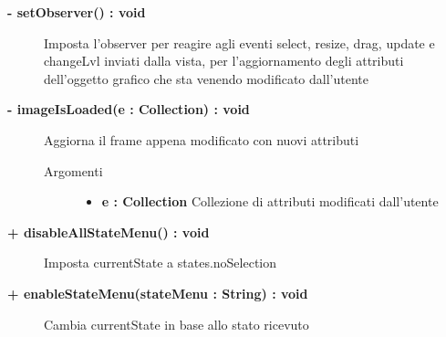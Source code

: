 \begin{description}
\begin{description}
\begin{description}
\begin{itemize}
				\end{itemize}
				
		\end{description}
	\end{description}
	
	\begin{description}
		\item[\textbf{\color{blue}- setObserver() : void		}] \hfill
			Imposta l'observer per reagire agli eventi select, resize, drag, update e changeLvl inviati dalla vista, per l'aggiornamento degli attributi dell'oggetto grafico che sta venendo modificato dall'utente 
		
	\end{description}
	
	\begin{description}
		\item[\textbf{\color{blue}- imageIsLoaded(e : Collection) : void			}] \hfill
			Aggiorna il frame appena modificato con nuovi attributi
			
		\begin{description}
			\item[Argomenti] \hfill
				\begin{itemize}
				
					\item \textbf{e : Collection		} \hfill
					Collezione di attributi modificati dall'utente
					
				\end{itemize}
				
		\end{description}
	\end{description}
	
	
	\begin{description}
		\item[\textbf{\color{blue}+ disableAllStateMenu() : void	}] \hfill
			Imposta currentState a states.noSelection 
		
	\end{description}
	
	\begin{description}
		\item[\textbf{\color{blue}+ enableStateMenu(stateMenu : String) : void		}] \hfill
			Cambia currentState in base allo stato ricevuto
			

\end{description}
\end{description}
